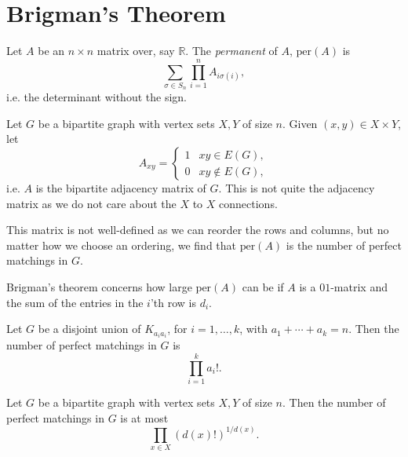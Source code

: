 \documentclass[12pt]{article}
\begin{document}
\newpage

\section{Brigman's Theorem}%
\label{sec:bt}

Let $A$ be an $n \times n$ matrix over, say $\mathbb{R}$. The \emph{permanent} of $A$, $\mathrm{per}(A)$ is
\[
\sum_{\sigma \in S_n} \prod_{i = 1}^n A_{i \sigma(i)},
\]
i.e. the determinant without the sign.

Let $G$ be a bipartite graph with vertex sets $X, Y$ of size $n$. Given $(x, y) \in X \times Y$, let
\[
A_{xy} =
\begin{cases}
	1 & xy \in E(G), \\
	0 & xy \not \in E(G),
\end{cases}
\]
i.e. $A$ is the bipartite adjacency matrix of $G$. This is not quite the adjacency matrix as we do not care about the $X$ to $X$ connections.

This matrix is not well-defined as we can reorder the rows and columns, but no matter how we choose an ordering, we find that $\mathrm{per}(A)$ is the number of perfect matchings in $G$.

Brigman's theorem concerns how large $\mathrm{per}(A)$ can be if $A$ is a $01$-matrix and the sum of the entries in the $i$'th row is $d_i$.

Let $G$ be a disjoint union of $K_{a_i a_i}$, for $i = 1, \ldots, k$, with $a_1 + \cdots + a_k = n$. Then the number of perfect matchings in $G$ is
\[
\prod_{i = 1}^k a_i !.
\]
\begin{theorem}[Brigman]
	Let $G$ be a bipartite graph with vertex sets $X, Y$ of size $n$. Then the number of perfect matchings in $G$ is at most
	\[
	\prod_{x \in X} (d(x)!)^{1/d(x)}.
	\]
\end{theorem}
\end{document}
